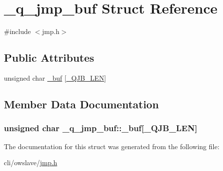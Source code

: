 \hypertarget{struct__q__jmp__buf}{\section{\-\_\-q\-\_\-jmp\-\_\-buf Struct Reference}
\label{struct__q__jmp__buf}
}


{\ttfamily \#include $<$jmp.\-h$>$}

\subsection*{Public Attributes}
\begin{DoxyCompactItemize}
\item 
unsigned char \hyperlink{struct__q__jmp__buf_ac12c0ce775b0996ba6f2f077aae94fdf}{\-\_\-buf} \mbox{[}\hyperlink{jmp_8h_ad1c44cd877b4930ca38854e520c611b6}{\-\_\-\-Q\-J\-B\-\_\-\-L\-E\-N}\mbox{]}
\end{DoxyCompactItemize}


\subsection{Member Data Documentation}
\hypertarget{struct__q__jmp__buf_ac12c0ce775b0996ba6f2f077aae94fdf}{
\subsubsection[{\-\_\-buf}]{\setlength{\rightskip}{0pt plus 5cm}unsigned char \-\_\-q\-\_\-jmp\-\_\-buf\-::\-\_\-buf\mbox{[}{\bf \-\_\-\-Q\-J\-B\-\_\-\-L\-E\-N}\mbox{]}}}\label{struct__q__jmp__buf_ac12c0ce775b0996ba6f2f077aae94fdf}


The documentation for this struct was generated from the following file\-:\begin{DoxyCompactItemize}
\item 
cli/owslave/\hyperlink{jmp_8h}{jmp.\-h}\end{DoxyCompactItemize}

